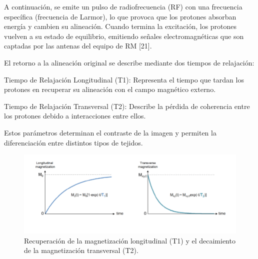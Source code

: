 A continuación, se emite un pulso de radiofrecuencia (RF) con una frecuencia específica (frecuencia de Larmor), lo que provoca que los protones absorban energía y cambien su alineación. Cuando termina la excitación, los protones vuelven a su estado de equilibrio, emitiendo señales electromagnéticas que son captadas por las antenas del equipo de RM [21]. 

 





 

El retorno a la alineación original se describe mediante dos tiempos de relajación: 

Tiempo de Relajación Longitudinal (T1): Representa el tiempo que tardan los protones en recuperar su alineación con el campo magnético externo. 

Tiempo de Relajación Transversal (T2): Describe la pérdida de coherencia entre los protones debido a interacciones entre ellos. 

Estos parámetros determinan el contraste de la imagen y permiten la diferenciación entre distintos tipos de tejidos. 

\begin{figure}[hbtp]
  \includegraphics[width=\linewidth]{imagenes/Relaxation-rates-of-longitudinal-magnetization-1-T1-and-transverse-magnetization-1-T2.png}
  \caption{Recuperación de la magnetización longitudinal (T1) y el decaimiento de la magnetización transversal (T2).}
  \label{fig:T1yT2}
\end{figure}


